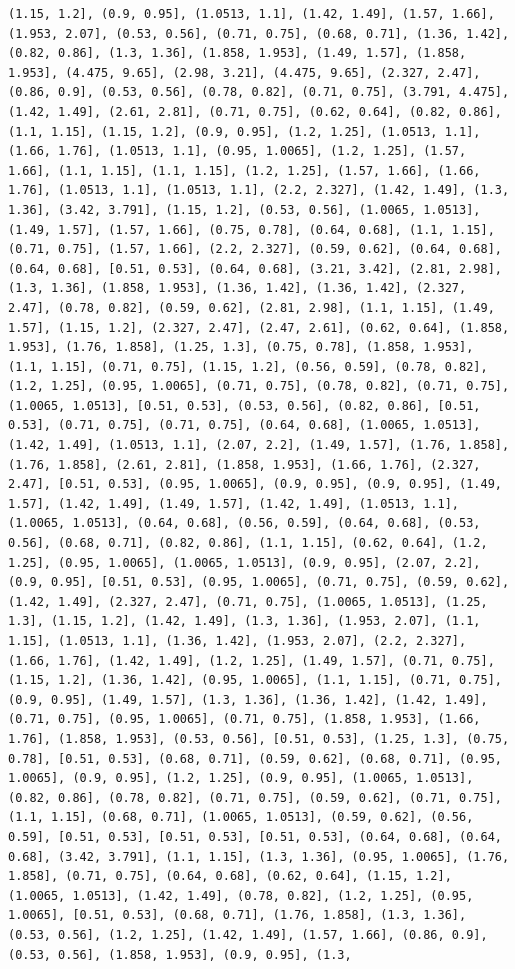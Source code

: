 \documentclass[12pt,fleqn]{article}\usepackage{../common}
\begin{document}
\begin{verbatim}
(1.15, 1.2], (0.9, 0.95], (1.0513, 1.1], (1.42, 1.49], (1.57, 1.66], (1.953, 2.07], (0.53, 0.56], (0.71, 0.75], (0.68, 0.71], (1.36, 1.42], (0.82, 0.86], (1.3, 1.36], (1.858, 1.953], (1.49, 1.57], (1.858, 1.953], (4.475, 9.65], (2.98, 3.21], (4.475, 9.65], (2.327, 2.47], (0.86, 0.9], (0.53, 0.56], (0.78, 0.82], (0.71, 0.75], (3.791, 4.475], (1.42, 1.49], (2.61, 2.81], (0.71, 0.75], (0.62, 0.64], (0.82, 0.86], (1.1, 1.15], (1.15, 1.2], (0.9, 0.95], (1.2, 1.25], (1.0513, 1.1], (1.66, 1.76], (1.0513, 1.1], (0.95, 1.0065], (1.2, 1.25], (1.57, 1.66], (1.1, 1.15], (1.1, 1.15], (1.2, 1.25], (1.57, 1.66], (1.66, 1.76], (1.0513, 1.1], (1.0513, 1.1], (2.2, 2.327], (1.42, 1.49], (1.3, 1.36], (3.42, 3.791], (1.15, 1.2], (0.53, 0.56], (1.0065, 1.0513], (1.49, 1.57], (1.57, 1.66], (0.75, 0.78], (0.64, 0.68], (1.1, 1.15], (0.71, 0.75], (1.57, 1.66], (2.2, 2.327], (0.59, 0.62], (0.64, 0.68], (0.64, 0.68], [0.51, 0.53], (0.64, 0.68], (3.21, 3.42], (2.81, 2.98], (1.3, 1.36], (1.858, 1.953], (1.36, 1.42], (1.36, 1.42], (2.327, 2.47], (0.78, 0.82], (0.59, 0.62], (2.81, 2.98], (1.1, 1.15], (1.49, 1.57], (1.15, 1.2], (2.327, 2.47], (2.47, 2.61], (0.62, 0.64], (1.858, 1.953], (1.76, 1.858], (1.25, 1.3], (0.75, 0.78], (1.858, 1.953], (1.1, 1.15], (0.71, 0.75], (1.15, 1.2], (0.56, 0.59], (0.78, 0.82], (1.2, 1.25], (0.95, 1.0065], (0.71, 0.75], (0.78, 0.82], (0.71, 0.75], (1.0065, 1.0513], [0.51, 0.53], (0.53, 0.56], (0.82, 0.86], [0.51, 0.53], (0.71, 0.75], (0.71, 0.75], (0.64, 0.68], (1.0065, 1.0513], (1.42, 1.49], (1.0513, 1.1], (2.07, 2.2], (1.49, 1.57], (1.76, 1.858], (1.76, 1.858], (2.61, 2.81], (1.858, 1.953], (1.66, 1.76], (2.327, 2.47], [0.51, 0.53], (0.95, 1.0065], (0.9, 0.95], (0.9, 0.95], (1.49, 1.57], (1.42, 1.49], (1.49, 1.57], (1.42, 1.49], (1.0513, 1.1], (1.0065, 1.0513], (0.64, 0.68], (0.56, 0.59], (0.64, 0.68], (0.53, 0.56], (0.68, 0.71], (0.82, 0.86], (1.1, 1.15], (0.62, 0.64], (1.2, 1.25], (0.95, 1.0065], (1.0065, 1.0513], (0.9, 0.95], (2.07, 2.2], (0.9, 0.95], [0.51, 0.53], (0.95, 1.0065], (0.71, 0.75], (0.59, 0.62], (1.42, 1.49], (2.327, 2.47], (0.71, 0.75], (1.0065, 1.0513], (1.25, 1.3], (1.15, 1.2], (1.42, 1.49], (1.3, 1.36], (1.953, 2.07], (1.1, 1.15], (1.0513, 1.1], (1.36, 1.42], (1.953, 2.07], (2.2, 2.327], (1.66, 1.76], (1.42, 1.49], (1.2, 1.25], (1.49, 1.57], (0.71, 0.75], (1.15, 1.2], (1.36, 1.42], (0.95, 1.0065], (1.1, 1.15], (0.71, 0.75], (0.9, 0.95], (1.49, 1.57], (1.3, 1.36], (1.36, 1.42], (1.42, 1.49], (0.71, 0.75], (0.95, 1.0065], (0.71, 0.75], (1.858, 1.953], (1.66, 1.76], (1.858, 1.953], (0.53, 0.56], [0.51, 0.53], (1.25, 1.3], (0.75, 0.78], [0.51, 0.53], (0.68, 0.71], (0.59, 0.62], (0.68, 0.71], (0.95, 1.0065], (0.9, 0.95], (1.2, 1.25], (0.9, 0.95], (1.0065, 1.0513], (0.82, 0.86], (0.78, 0.82], (0.71, 0.75], (0.59, 0.62], (0.71, 0.75], (1.1, 1.15], (0.68, 0.71], (1.0065, 1.0513], (0.59, 0.62], (0.56, 0.59], [0.51, 0.53], [0.51, 0.53], [0.51, 0.53], (0.64, 0.68], (0.64, 0.68], (3.42, 3.791], (1.1, 1.15], (1.3, 1.36], (0.95, 1.0065], (1.76, 1.858], (0.71, 0.75], (0.64, 0.68], (0.62, 0.64], (1.15, 1.2], (1.0065, 1.0513], (1.42, 1.49], (0.78, 0.82], (1.2, 1.25], (0.95, 1.0065], [0.51, 0.53], (0.68, 0.71], (1.76, 1.858], (1.3, 1.36], (0.53, 0.56], (1.2, 1.25], (1.42, 1.49], (1.57, 1.66], (0.86, 0.9], (0.53, 0.56], (1.858, 1.953], (0.9, 0.95], (1.3, 
\end{verbatim}
\end{document}
